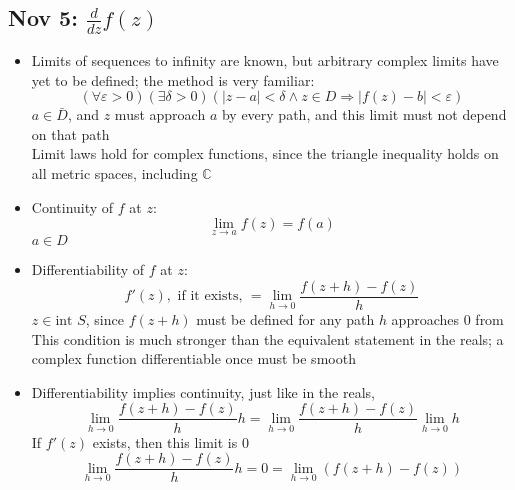 \documentclass[10pt, oneside]{article}
\newcommand{\ltz}[1]{\lim_{#1 \rightarrow 0}}
\let\ep\varepsilon
\let\de\delta
\newcommand{\C}{\mathbb{C}}
\begin{document}
\subsection{Nov 5: $\frac{d}{dz}f(z)$}
\begin{itemize}
    \item Limits of sequences to infinity are known, but arbitrary complex limits have yet to be defined; the method is very familiar:
        \[(\forall \ep > 0)(\exists \de > 0)(|z - a| < \de \land z \in D \Rightarrow |f(z) - b| < \ep)\]
        $a \in \bar{D}$, and $z$ must approach $a$ by every path, and this limit must not depend on that path\\
        Limit laws hold for complex functions, since the triangle inequality holds on all metric spaces, including $\C$
    \item Continuity of $f$ at $z$:
        \[\lim_{z \rightarrow a} f(z) = f(a)\]
        $a \in D$
    \item Differentiability of $f$ at $z$:
        \[f'(z), \text{ if it exists, } = \ltz{h} \frac{f(z+h) - f(z)}{h}\]
        $z \in \text{int } S$, since $f(z + h)$ must be defined for any path $h$ approaches $0$ from\\
        This condition is much stronger than the equivalent statement in the reals; a complex function differentiable once must be smooth
    \item Differentiability implies continuity, just like in the reals,
        \[\ltz{h} \frac{f(z+h) - f(z)}{h}h = \ltz{h} \frac{f(z+h)-f(z)}{h} \ltz{h}h\]
        If $f'(z)$ exists, then this limit is $0$
        \[\ltz{h} \frac{f(z+h) - f(z)}{h}h = 0 =\ltz{h} (f(z+h) - f(z))\]
\end{itemize}
\end{document}
